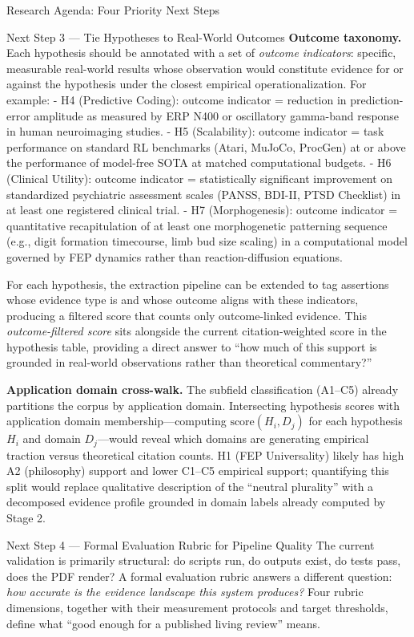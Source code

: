 \documentclass[
  ignorenonframetext,
]{beamer}
\begin{document}
\begin{frame}{Research Agenda: Four Priority
Next Steps \label{sec:next_steps}}
\begin{block}{Next Step 3 --- Tie Hypotheses to Real-World Outcomes}
\textbf{Outcome taxonomy.} Each hypothesis should be annotated with a
set of \emph{outcome indicators}: specific, measurable real-world
results whose observation would constitute evidence for or against the
hypothesis under the closest empirical operationalization. For example:
- H4 (Predictive Coding): outcome indicator = reduction in
prediction-error amplitude as measured by ERP N400 or oscillatory
gamma-band response in human neuroimaging studies. - H5 (Scalability):
outcome indicator = task performance on standard RL benchmarks (Atari,
MuJoCo, ProcGen) at or above the performance of model-free SOTA at
matched computational budgets. - H6 (Clinical Utility): outcome
indicator = statistically significant improvement on standardized
psychiatric assessment scales (PANSS, BDI-II, PTSD Checklist) in at
least one registered clinical trial. - H7 (Morphogenesis): outcome
indicator = quantitative recapitulation of at least one morphogenetic
patterning sequence (e.g., digit formation timecourse, limb bud size
scaling) in a computational model governed by FEP dynamics rather than
reaction-diffusion equations.

For each hypothesis, the extraction pipeline can be extended to tag
assertions whose evidence type is  and
whose outcome aligns with these indicators, producing a filtered score
that counts only outcome-linked evidence. This \emph{outcome-filtered
score} sits alongside the current citation-weighted score in the
hypothesis table, providing a direct answer to ``how much of this
support is grounded in real-world observations rather than theoretical
commentary?''

\textbf{Application domain cross-walk.} The subfield classification
(A1--C5) already partitions the corpus by application domain.
Intersecting hypothesis scores with application domain
membership---computing \(\text{score}(H_i, D_j)\) for each hypothesis
\(H_i\) and domain \(D_j\)---would reveal which domains are generating
empirical traction versus theoretical citation counts. H1 (FEP
Universality) likely has high A2 (philosophy) support and lower C1--C5
empirical support; quantifying this split would replace qualitative
description of the ``neutral plurality'' with a decomposed evidence
profile grounded in domain labels already computed by Stage 2.
\end{block}

\begin{block}{Next Step 4 --- Formal Evaluation Rubric for Pipeline
Quality}
\protect{}\label{next-step-4-formal-evaluation-rubric-for-pipeline-quality}
The current validation is primarily structural: do scripts run, do
outputs exist, do tests pass, does the PDF render? A formal evaluation
rubric answers a different question: \emph{how accurate is the evidence
landscape this system produces?} Four rubric dimensions, together with
their measurement protocols and target thresholds, define what ``good
enough for a published living review'' means.


\end{block}
\end{frame}
\end{document}
